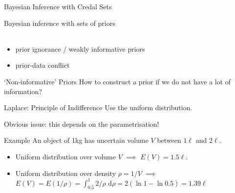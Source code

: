 \documentclass{beamer}
\newcommand{\dd}{\,\mathrm{d}}
\begin{document}
\begin{frame}{Bayesian Inference with Credal Sets}
\begin{block}{Bayesian inference with sets of priors}
\\[1ex]
\\[1ex]
\end{block}
\begin{itemize}
\item<4-> prior ignorance / weakly informative priors
\item<5-> prior-data conflict
\end{itemize}
\end{frame}

\begin{frame}{`Non-informative' Priors}
  How to construct a prior if we do not have a lot of information?
\pause
  \begin{block}{Laplace: Principle of Indifference}
    Use the uniform distribution.
  \end{block}
\pause
  Obvious issue: this depends on the parametrisation!
\pause
  \begin{exampleblock}{Example}
    An object of 1kg has uncertain volume $V$ between $1\ell$ and $2\ell$.
    \begin{itemize}
    \item<5-> Uniform distribution over volume $V$ $\implies$ $E(V)=1.5\ell$.
    \item<6-> Uniform distribution over density $\rho=1/V$ $\implies$ \\
      $E(V)=E(1/\rho)=\int_{0.5}^1 2/\rho\, \dd\rho=2(\ln 1-\ln 0.5)=1.39\ell$
    \end{itemize}
  \end{exampleblock}
\end{frame}
\end{document}
